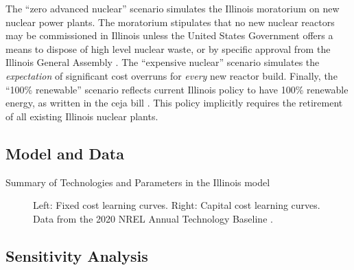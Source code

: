 The ``zero advanced nuclear'' scenario simulates the Illinois moratorium on new nuclear
power plants. The moratorium stipulates that no new nuclear reactors may be
commissioned in Illinois unless the United States Government offers a means to
dispose of high level nuclear waste, or by specific approval from the Illinois
General Assembly \cite{shea_states_2021}. The ``expensive nuclear'' scenario
simulates the \textit{expectation} of significant cost overruns for \textit{every}
new reactor build. Finally, the ``100\% renewable'' scenario reflects current
Illinois policy to have 100\% renewable energy, as written in the \gls{ceja} bill
\cite{harmon_climate_2021}. This policy implicitly requires the retirement of
all existing Illinois nuclear plants.

\subsection{Model and Data}

\begin{table}[H]
  \centering
  \caption{Summary of Technologies and Parameters in the Illinois model}
  \label{tab:il-tech}
  \resizebox{\textwidth}{!}{
  
  } %
\end{table}


\begin{figure}[H]
  \begin{minipage}{0.5\textwidth}
    \centering
    \resizebox{\textwidth}{!}{}
  \end{minipage}
  \begin{minipage}{0.5\textwidth}
    \centering
    \resizebox{\textwidth}{!}{}
  \end{minipage}
  \label{fig:costs}
  \caption{Left: Fixed cost learning curves. Right: Capital cost learning curves.
  Data from the 2020 NREL Annual Technology Baseline \cite{nrel_2020_2020}.}
\end{figure}

\subsection{Sensitivity Analysis}
